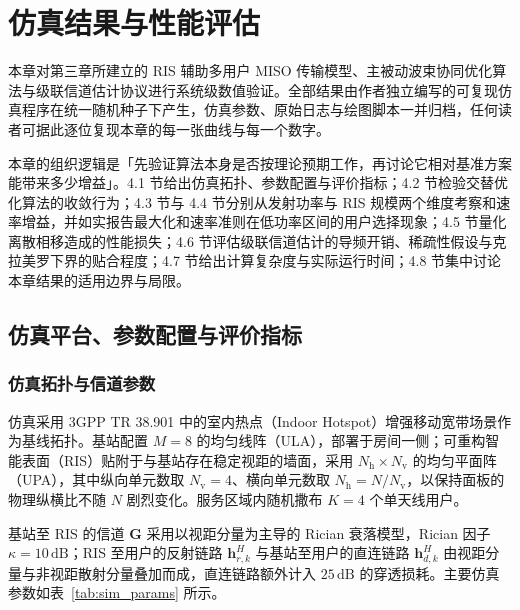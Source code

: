 \chapter{仿真结果与性能评估}
\label{chap:experiments}

本章对第三章所建立的 RIS 辅助多用户 MISO 传输模型、主被动波束协同优化算法与级联信道估计协议进行系统级数值验证。全部结果由作者独立编写的可复现仿真程序在统一随机种子下产生，仿真参数、原始日志与绘图脚本一并归档，任何读者可据此逐位复现本章的每一张曲线与每一个数字。

本章的组织逻辑是「先验证算法本身是否按理论预期工作，再讨论它相对基准方案能带来多少增益」。4.1 节给出仿真拓扑、参数配置与评价指标；4.2 节检验交替优化算法的收敛行为；4.3 节与 4.4 节分别从发射功率与 RIS 规模两个维度考察和速率增益，并如实报告最大化和速率准则在低功率区间的用户选择现象；4.5 节量化离散相移造成的性能损失；4.6 节评估级联信道估计的导频开销、稀疏性假设与克拉美罗下界的贴合程度；4.7 节给出计算复杂度与实际运行时间；4.8 节集中讨论本章结果的适用边界与局限。

\section{仿真平台、参数配置与评价指标}
\label{sec:sim_setup}

\subsection{仿真拓扑与信道参数}

仿真采用 3GPP TR 38.901 中的室内热点（Indoor Hotspot）增强移动宽带场景作为基线拓扑。基站配置 $M=8$ 的均匀线阵（ULA），部署于房间一侧；可重构智能表面（RIS）贴附于与基站存在稳定视距的墙面，采用 $N_{\mathrm{h}} \times N_{\mathrm{v}}$ 的均匀平面阵（UPA），其中纵向单元数取 $N_{\mathrm{v}} = 4$、横向单元数取 $N_{\mathrm{h}} = N/N_{\mathrm{v}}$，以保持面板的物理纵横比不随 $N$ 剧烈变化。服务区域内随机撒布 $K=4$ 个单天线用户。

基站至 RIS 的信道 $\bm{G}$ 采用以视距分量为主导的 Rician 衰落模型，Rician 因子 $\kappa = 10\,\mathrm{dB}$；RIS 至用户的反射链路 $\bm{h}_{r,k}^{H}$ 与基站至用户的直连链路 $\bm{h}_{d,k}^{H}$ 由视距分量与非视距散射分量叠加而成，直连链路额外计入 $25\,\mathrm{dB}$ 的穿透损耗。主要仿真参数如表~\ref{tab:sim_params} 所示。

